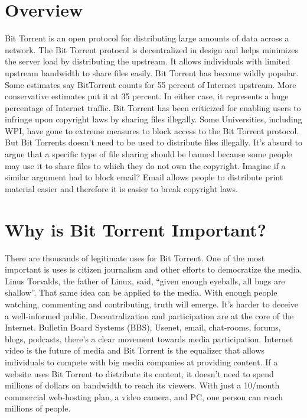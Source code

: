 \documentclass[a4paper,12pt]{report}
\begin{document}
\section{Overview}
Bit Torrent is an open protocol for distributing large amounts of data across a network. The Bit Torrent protocol is decentralized in design and helps minimizes the server load by distributing the upstream. It allows individuals with limited upstream bandwidth to share files easily. 
Bit Torrent has become wildly popular. Some estimates say BitTorrent counts for 55 percent of Internet upstream. More conservative estimates put it at 35 percent. In either case, it represents a huge percentage of Internet traffic.
Bit Torrent has been criticized for enabling users to infringe upon copyright laws by sharing files illegally. Some Universities, including WPI, have gone to extreme measures to block access to the Bit Torrent protocol. But Bit Torrents doesn’t need to be used to distribute files illegally. It’s absurd to argue that a specific type of file sharing should be banned because some people may use it to share files to which they do not own the copyright. Imagine if a similar argument had to block email? Email allows people to distribute print material easier and therefore it is easier to break copyright laws. 

\section{Why is Bit Torrent Important?}
There are thousands of legitimate uses for Bit Torrent. One of the most important is uses is citizen journalism and other efforts to democratize the media. Linus Torvalds, the father of Linux, said, “given enough eyeballs, all bugs are shallow”. That same idea can be applied to the media. With enough people watching, commenting and contributing, truth will emerge. It’s harder to deceive a well-informed public. 
Decentralization and participation are at the core of the Internet. Bulletin Board Systems (BBS), Usenet, email, chat-rooms, forums, blogs, podcasts, there’s a clear movement towards media participation. Internet video is the future of media and Bit Torrent is the equalizer that allows individuals to compete with big media companies at providing content. If a website uses Bit Torrent to distribute its content, it doesn’t need to spend millions of dollars on bandwidth to reach its viewers. With just a 10/month commercial web-hosting plan, a video camera, and PC, one person can reach millions of people.
\end{document}
